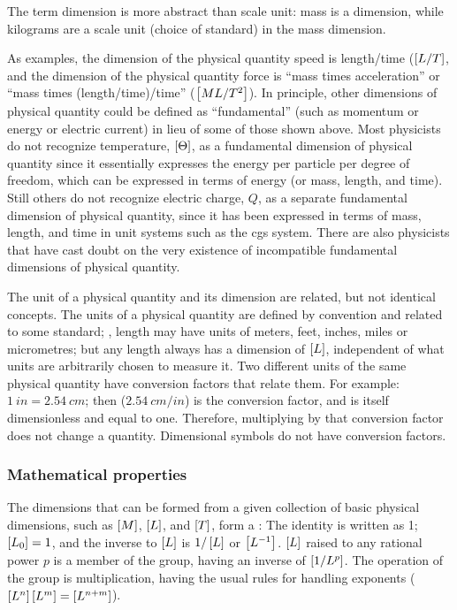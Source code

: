 The term dimension is more abstract than scale unit: mass is a dimension, while kilograms are a scale unit (choice of standard) in the mass dimension.

As examples, the dimension of the physical quantity speed is length/time ($\left[{L/T}\right]$, and the dimension of the physical quantity force is ``mass times acceleration'' or ``mass times (length/time)/time'' ($\left[{ML/T^2}\right]$). In principle, other dimensions of physical quantity could be defined as ``fundamental'' (such as momentum or energy or electric current) in lieu of some of those shown above. Most physicists do not recognize temperature, $\left[{\Theta}\right]$, as a fundamental dimension of physical quantity since it essentially expresses the energy per particle per degree of freedom, which can be expressed in terms of energy (or mass, length, and time). Still others do not recognize electric charge, $Q$, as a separate fundamental dimension of physical quantity, since it has been expressed in terms of mass, length, and time in unit systems such as the cgs system. There are also physicists that have cast doubt on the very existence of incompatible fundamental dimensions of physical quantity.

The unit of a physical quantity and its dimension are related, but not identical concepts. The units of a physical quantity are defined by convention and related to some standard; \eg, length may have units of meters, feet, inches, miles or micrometres; but any length always has a dimension of $\left[{L}\right]$, independent of what units are arbitrarily chosen to measure it. Two different units of the same physical quantity have conversion factors that relate them. For example: $\SI{1}{in} = \SI{2.54}{cm}$; then ($\SI{2.54}{cm/in}$) is the conversion factor, and is itself dimensionless and equal to one. Therefore, multiplying by that conversion factor does not change a quantity. Dimensional symbols do not have conversion factors.


\subsubsection{Mathematical properties}
The dimensions that can be formed from a given collection of basic physical dimensions, such as $\left[{M}\right]$, $\left[{L}\right]$, and $\left[{T}\right]$, form a : The identity is written as 1; $\left[{L_0}\right] = 1$, and the inverse to $\left[{L}\right]$ is $1/\left[{L}\right]$ or $\left[{L^{-1}}\right]$. $\left[{L}\right]$ raised to any rational power $p$ is a member of the group, having an inverse of $\left[{1/L^p}\right]$. The operation of the group is multiplication, having the usual rules for handling exponents ($\left[{L^n}\right]\left[{L^m}\right] = \left[{L^{n+m}}\right]$).

